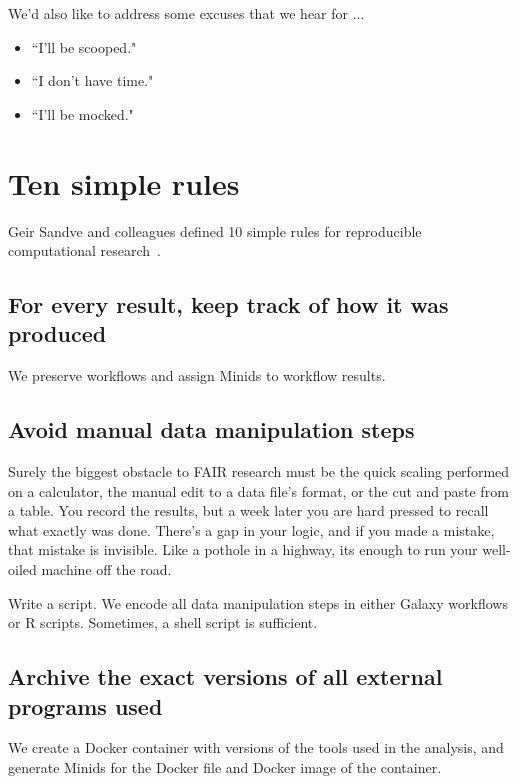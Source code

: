 \documentclass[11pt]{article}
\begin{document}
We'd also like to address some excuses that we hear for ... 

\begin{itemize}
\item
``I'll be scooped."

\item
``I don't have time."

\item
``I'll be mocked."
 
\end{itemize}


\section{Ten simple rules}

Geir Sandve and colleagues defined 10 simple rules for reproducible computational research~\cite{sandve2013ten}.

\subsection{For every result, keep track of how it was produced} 


We preserve workflows and assign Minids to workflow results.

\subsection{Avoid manual data manipulation steps} 

Surely the biggest obstacle to FAIR research must be the quick scaling performed on a calculator, 
the manual edit to a data file's format, 
or the cut and paste from a table. 
You record the results, but a week later you are hard pressed to recall what exactly was done.
There's a gap in your logic, and if you made a mistake, that mistake is invisible.
Like a pothole in a highway, its enough to run your well-oiled machine off the road.

Write a script.
We encode all data manipulation steps in either Galaxy workflows or R scripts.
Sometimes, a shell script is sufficient.



\subsection{Archive the exact versions of all external programs used} 
We create a Docker container with versions of the tools used in the analysis, 
and generate Minids for the Docker file and Docker image of the container.
\end{document}
